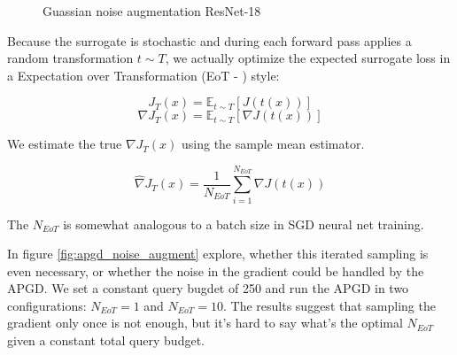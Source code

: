 \begin{figure}
\centering
 \hfill
 \hfill

 \hfill
 \hfill

 \hfill
 \hfill

\caption{Guassian noise augmentation ResNet-18}
\label{fig:apgd_noise_smooth_gradient}
\end{figure}


Because the surrogate is stochastic and during each forward pass applies a random transformation $t \sim T$, we actually optimize the expected surrogate loss in a Expectation over Transformation (EoT - \cite{athalye2018synthesizing}) style:

$$J_{T}(x) = \mathbb{E}_{t \sim T}[J(t(x))]$$
$$\nabla J_{T}(x) = \mathbb{E}_{t \sim T}[\nabla J(t(x))]$$

We estimate the true $\nabla J_T(x)$ using the sample mean estimator.

$$\widehat{\nabla} J_{T}(x) = \frac{1}{N_{EoT}} \sum_{i=1}^{N_{EoT}} \nabla J(t(x))$$

The $N_{EoT}$ is somewhat analogous to a batch size in SGD neural net training.

In figure \ref{fig:apgd_noise_augment} explore, whether this iterated sampling is even necessary, or whether the noise in the gradient could be handled by the APGD. We set a constant query bugdet of 250 and run the APGD in two configurations: $N_{EoT} = 1$ and $N_{EoT} = 10$. The results suggest that sampling the gradient only once is not enough, but it's hard to say what's the optimal $N_{EoT}$ given a constant total query budget. 

